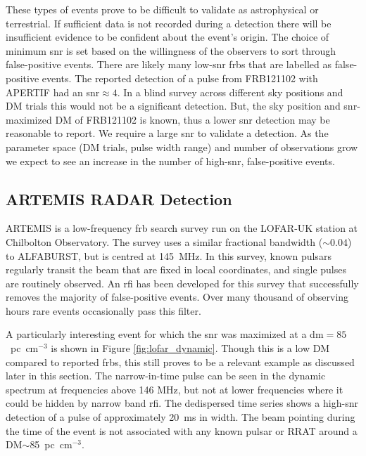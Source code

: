 \documentclass[a4paper,fleqn,usenatbib]{mnras}
\begin{document}
These types of events prove to be difficult to validate as astrophysical or
terrestrial. If sufficient data is not recorded during a detection there will be
insufficient evidence to be confident about the event's origin. The choice of
minimum \gls{snr} is set based on the willingness of the observers to sort
through false-positive events. There are likely many low-\gls{snr} \glspl{frb}
that are labelled as false-positive events.  The reported detection of a pulse
from FRB121102 with APERTIF \citep{atel10693} had an \gls{snr}$\approx 4$. In a
blind survey across different sky positions and DM trials this would not be a
significant detection. But, the sky position and \gls{snr}-maximized DM of
FRB121102 is known, thus a lower \gls{snr} detection may be reasonable to
report.  We require a large \gls{snr} to validate a detection.  As the parameter
space (DM trials, pulse width range) and number of observations grow we expect
to see an increase in the number of high-\gls{snr}, false-positive events.

\subsection{ARTEMIS RADAR Detection}
\label{sec:LOFAR_RADAR}

ARTEMIS \citep{2015MNRAS.452.1254K} is a low-frequency \gls{frb} search survey
run on the LOFAR-UK station at Chilbolton Observatory.  The survey uses a
similar fractional bandwidth ($\sim 0.04$) to ALFABURST, but is centred at
145~MHz.  In this survey, known pulsars regularly transit the beam that are
fixed in local coordinates, and single pulses are routinely observed.  An
\gls{rfi} has been developed for this survey that successfully removes the
majority of false-positive events. Over many thousand of observing hours rare
events occasionally pass this filter.

A particularly interesting event for which the \gls{snr} was maximized at a
\gls{dm}$= 85$~pc~cm$^{-3}$ is shown in Figure \ref{fig:lofar_dynamic}. Though
this is a low DM compared to reported \glspl{frb}, this still proves to be a
relevant example as discussed later in this section.  The narrow-in-time pulse
can be seen in the dynamic spectrum at frequencies above 146 MHz, but not at
lower frequencies where it could be hidden by narrow band \gls{rfi}.  The
dedispersed time series shows a high-\gls{snr} detection of a pulse of
approximately 20~ms in width.
The beam pointing during the time of the event is not associated with any known
pulsar or RRAT around a DM$\sim$85~pc~cm$^{-3}$.
\end{document}
